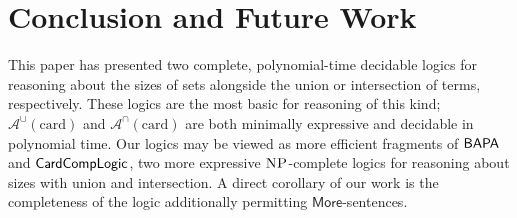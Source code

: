 \documentclass[letterpaper]{article}
\theoremstyle{definition}
\newcommand{\Aunion}{\mathscr{A}^{\cup}}
\newcommand{\Ainter}{\mathscr{A}^{\cap}}
\newcommand{\BAPA}{\sf{BAPA}}
\newcommand{\CardCompLogic}{\sf{CardCompLogic}}
\newcommand{\NP}{\textsc{NP}}
\newcommand{\MoreNoArgs}{\mathsf{More}}
\newcommand{\card}{\mathrm{card}}
\begin{document}
\section{Conclusion and Future Work}

This paper has presented two complete, polynomial-time decidable logics for reasoning about the sizes of sets alongside the union or intersection of terms, respectively.  These logics are the most basic for reasoning of this kind; $\Aunion(\card)$ and $\Ainter(\card)$ are both minimally expressive and decidable in polynomial time.  Our logics may be viewed as more efficient fragments of $\BAPA$ and $\CardCompLogic$, two more expressive $\NP$-complete logics for reasoning about sizes with union and intersection.  A direct corollary of our work is the completeness of the logic additionally permitting $\MoreNoArgs$-sentences.
\end{document}
